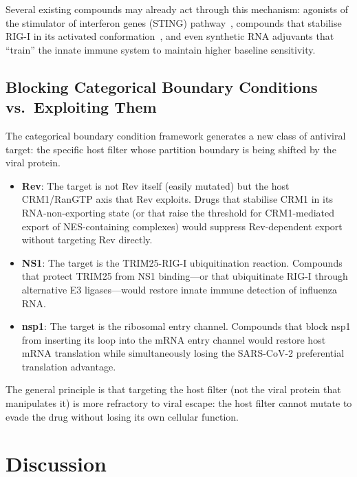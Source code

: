 \documentclass[11pt,twocolumn,a4paper]{article}
\theoremstyle{definition}
\theoremstyle{remark}
\begin{document}
Several existing compounds may already act through this mechanism: agonists of the stimulator of interferon genes (STING) pathway~\cite{Ablasser2013}, compounds that stabilise RIG-I in its activated conformation~\cite{Choudhury2019}, and even synthetic RNA adjuvants that ``train'' the innate immune system to maintain higher baseline sensitivity.

\subsection{Blocking Categorical Boundary Conditions vs.\ Exploiting Them}

The categorical boundary condition framework generates a new class of antiviral target: the specific host filter whose partition boundary is being shifted by the viral protein.

\begin{itemize}
  \item \textbf{Rev}: The target is not Rev itself (easily mutated) but the host CRM1/RanGTP axis that Rev exploits. Drugs that stabilise CRM1 in its RNA-non-exporting state (or that raise the threshold for CRM1-mediated export of NES-containing complexes) would suppress Rev-dependent export without targeting Rev directly.
  \item \textbf{NS1}: The target is the TRIM25-RIG-I ubiquitination reaction. Compounds that protect TRIM25 from NS1 binding---or that ubiquitinate RIG-I through alternative E3 ligases---would restore innate immune detection of influenza RNA.
  \item \textbf{nsp1}: The target is the ribosomal entry channel. Compounds that block nsp1 from inserting its loop into the mRNA entry channel would restore host mRNA translation while simultaneously losing the SARS-CoV-2 preferential translation advantage.
\end{itemize}

The general principle is that targeting the host filter (not the viral protein that manipulates it) is more refractory to viral escape: the host filter cannot mutate to evade the drug without losing its own cellular function.

\section{Discussion}
\label{sec:discussion}
\end{document}
